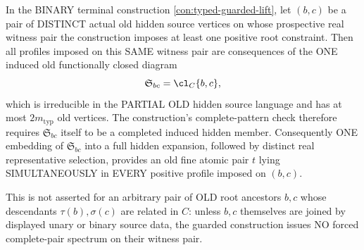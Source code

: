 \begin{lemma}
\label{lem:typed-one-source-support-per-guarded-pair}
In the BINARY terminal construction
\cref{con:typed-guarded-lift},
let \((b,c)\) be a pair of
DISTINCT actual old hidden
source vertices on whose
prospective real witness pair
the construction imposes at
least one positive root
constraint. Then all profiles
imposed on this SAME witness
pair are consequences of
the ONE induced old
functionally closed diagram
\[
                   \mathfrak S_{bc}=\cl_C\{b,c\},
\]
which is irreducible in the
PARTIAL OLD hidden source
language and has at most
\(2m_{\mathrm{typ}}\) old
vertices. The construction's
complete-pattern check
therefore requires \(\mathfrak S_{bc}\)
itself to be a completed
induced hidden member.
Consequently ONE embedding
of \(\mathfrak S_{bc}\) into a full
hidden expansion, followed
by distinct real
representative selection,
provides an old fine atomic
pair \(t\) lying
SIMULTANEOUSLY in EVERY
positive profile imposed on
\((b,c)\).

This is not asserted for
an arbitrary pair of
OLD root ancestors \(b,c\)
whose descendants
\(\tau(b),\sigma(c)\) are
related in \(C\): unless
\(b,c\) themselves are
joined by displayed unary
or binary source data,
the guarded construction
issues NO forced
complete-pair spectrum on
their witness pair.
\end{lemma}
